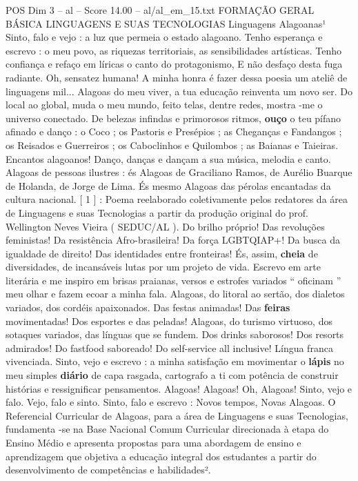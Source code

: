 \begin{textsample}{POS Dim 3 – al – Score 14.00 – al/al\_em\_15.txt}  \label{ex:f3_pos_220}
FORMAÇÃO GERAL BÁSICA LINGUAGENS E SUAS TECNOLOGIAS Linguagens Alagoanas¹ Sinto, falo e vejo : a luz que permeia o estado alagoano.
Tenho esperança e escrevo : o meu povo, as riquezas territoriais, as sensibilidades artísticas.
Tenho confiança e refaço em líricas o canto do protagonismo, E não desfaço desta fuga radiante.
Oh, sensatez humana!
A minha honra é fazer dessa poesia um ateliê de linguagens mil...
Alagoas do meu viver, a tua educação reinventa um novo ser.
Do local ao global, muda o meu mundo, feito telas, dentre redes, mostra -me o universo conectado.
De belezas infindas e primorosos ritmos, \textbf{ouço} o teu pífano afinado e danço : o Coco ; os Pastoris e Presépios ; as Cheganças e Fandangos ; os Reisados e Guerreiros ; os Caboclinhos e Quilombos ; as Baianas e Taieiras.
Encantos alagoanos!
Danço, danças e dançam a sua música, melodia e canto.
Alagoas de pessoas ilustres : és Alagoas de Graciliano Ramos, de Aurélio Buarque de Holanda, de Jorge de Lima.
És mesmo Alagoas das pérolas encantadas da cultura nacional. [ 1 ] : Poema reelaborado coletivamente pelos redatores da área de Linguagens e suas Tecnologias a partir da produção original do prof.
Wellington Neves Vieira ( SEDUC/AL ).
Do brilho próprio!
Das revoluções feministas!
Da resistência Afro-brasileira!
Da força LGBTQIAP+!
Da busca da igualdade de direito!
Das identidades entre fronteiras!
És, assim, \textbf{cheia} de diversidades, de incansáveis lutas por um projeto de vida.
Escrevo em arte literária e me inspiro em brisas praianas, versos e estrofes variados “ oficinam ” meu olhar e fazem ecoar a minha fala.
Alagoas, do litoral ao sertão, dos dialetos variados, dos cordéis apaixonados.
Das festas animadas!
Das \textbf{feiras} movimentadas!
Dos esportes e das peladas!
Alagoas, do turismo virtuoso, dos sotaques variados, das línguas que se fundem.
Dos drinks saborosos!
Dos resorts admirados!
Do fastfood saboreado!
Do self-service all inclusive!
Língua franca vivenciada.
Sinto, vejo e escrevo : a minha satisfação em movimentar o \textbf{lápis} no meu simples \textbf{diário} de capa rasgada, cartografo a ti com potência de construir histórias e ressignificar pensamentos.
Alagoas!
Alagoas!
Oh, Alagoas!
Sinto, vejo e falo.
Vejo, falo e sinto.
Sinto, falo e escrevo : Novos tempos, Novas Alagoas.
O Referencial Curricular de Alagoas, para a área de Linguagens e suas Tecnologias, fundamenta -se na Base Nacional Comum Curricular direcionada à etapa do Ensino Médio e apresenta propostas para uma abordagem de ensino e aprendizagem que objetiva a educação integral dos estudantes a partir do desenvolvimento de competências e habilidades².

\end{textsample}
